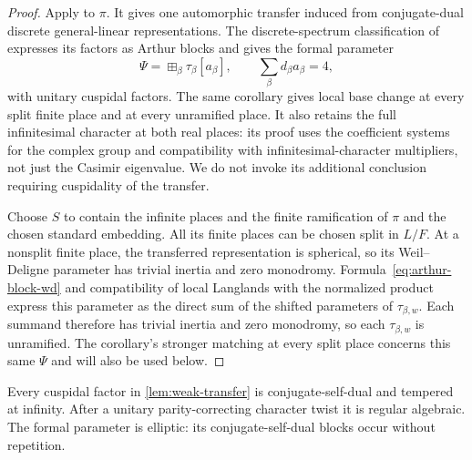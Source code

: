 \begin{proof}
Apply \citet[Corollary~5.3]{Labesse2011CM} to $\pi$.
It gives one automorphic transfer induced from conjugate-dual
discrete general-linear representations.  The discrete-spectrum
classification of \citet{MoeglinWaldspurger1989} expresses its
factors as Arthur blocks and gives the formal parameter
\[
 \Psi=\boxplus_\beta\tau_\beta[a_\beta],
 \qquad \sum_\beta d_\beta a_\beta=4,
\]
with unitary cuspidal factors.  The same corollary gives local
base change at every split finite place and at every unramified
place.  It also retains the full infinitesimal character at both
real places: its proof uses the coefficient systems for the
complex group and compatibility with infinitesimal-character
multipliers, not just the Casimir eigenvalue.  We do not invoke
its additional conclusion requiring cuspidality of the transfer.

Choose $S$ to contain the infinite places and the finite ramification
of $\pi$ and the chosen standard embedding.  All its finite places
can be chosen split in $L/F$.  At a nonsplit finite place, the
transferred representation is spherical, so its Weil--Deligne
parameter has trivial inertia and zero monodromy.
Formula~\eqref{eq:arthur-block-wd} and compatibility of local
Langlands with the normalized product express this parameter as
the direct sum of the shifted parameters of $\tau_{\beta,w}$.
Each summand therefore has trivial inertia and zero monodromy,
so each $\tau_{\beta,w}$ is unramified.
The corollary's stronger matching at every split
place concerns this same $\Psi$ and will also be used below.
\end{proof}

\begin{lemma}
\label{lem:transfer-algebraicity}
Every cuspidal factor in \cref{lem:weak-transfer} is
conjugate-self-dual and tempered at infinity.  After a unitary
parity-correcting character twist it is regular algebraic.
The formal parameter is elliptic: its conjugate-self-dual blocks
occur without repetition.
\end{lemma}


